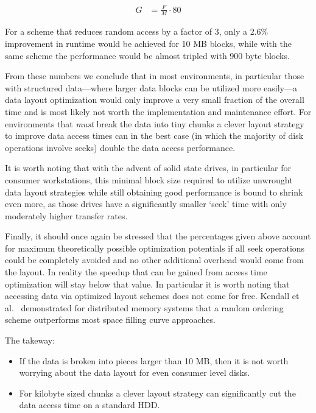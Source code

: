 \begin{align*}
G  &=   \frac{F}{M} \cdot 80
\end{align*}

For a scheme that reduces random access by a factor of 3, only a 2.6\%
improvement in runtime would be achieved for 10 MB blocks, while with the same scheme
the performance would be almost tripled with 900 byte blocks.

From these numbers we conclude that in most environments, in particular
those with structured data---where larger data blocks can be
utilized more easily---a data layout optimization would only improve
a very small fraction of the overall time and is most likely not worth
the implementation and
maintenance effort. For environments that \emph{must} break the data into
tiny chunks a clever layout strategy to improve data access times can in the
best case (in which the majority of disk operations involve seeks) double the
data access performance.


It is worth noting that with the advent of solid state drives, in
particular for consumer workstations, this minimal block size required
to utilize unwrought data layout strategies while still obtaining
good performance is bound to shrink even more, as those drives have a
significantly smaller `seek' time with only moderately higher transfer
rates.

Finally, it should once again be stressed that the percentages
given above account for maximum theoretically possible optimization
potentials if all seek operations could be completely avoided and no
other additional overhead would come from the layout.  In reality the
speedup that can be gained from access time optimization will stay
below that value. In particular it is worth noting that accessing data
via optimized layout schemes does not come
for free. Kendall et al.~\cite{Kendall:2009:TDO} demonstrated for
distributed memory systems that a random ordering scheme outperforms
most space filling curve approaches.

The takeway:

\begin{itemize}
  \item If the data is broken into pieces larger than 10 MB, then it
  is not worth worrying about the data layout for even consumer level
  disks.
  \item For kilobyte sized chunks a clever layout strategy can
           significantly cut the data access time on a standard HDD.
\end{itemize}


